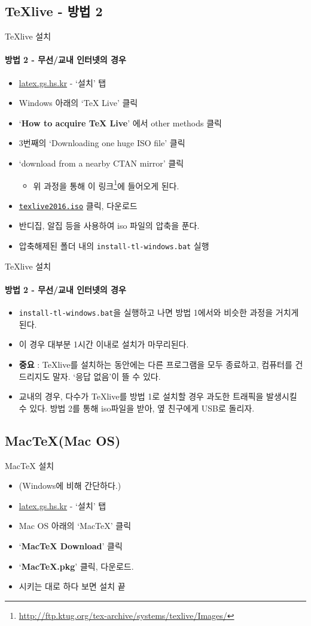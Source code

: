 \documentclass[12pt]{beamer}
\begin{document}
\subsection{TeXlive - 방법 2}
\begin{frame}{TeXlive 설치}
	\framesubtitle{방법 2 - 무선/교내 인터넷의 경우}
	\small
	\begin{itemize}
		\item \url{latex.gs.hs.kr} - `설치' 탭
		\item Windows 아래의 `TeX Live' 클릭
		\item `\textbf{How to acquire TeX Live}' 에서 other methods 클릭
		\item 3번째의 `Downloading one huge ISO file' 클릭
		\item `download from a nearby CTAN mirror' 클릭
		\begin{itemize}
			\item 위 과정을 통해 이 링크\footnote{\url{http://ftp.ktug.org/tex-archive/systems/texlive/Images/}}에 들어오게 된다.
		\end{itemize}
		\item \texttt{\underline{texlive2016.iso}} 클릭, 다운로드
		\item 반디집, 알집 등을 사용하여 iso 파일의 압축을 푼다.
		\item 압축해제된 폴더 내의 \texttt{install-tl-windows.bat} 실행
	\end{itemize}
\end{frame}
\begin{frame}{TeXlive 설치}
	\framesubtitle{방법 2 - 무선/교내 인터넷의 경우}
	\begin{itemize}
		\item \texttt{install-tl-windows.bat}을 실행하고 나면 방법 1에서와 비슷한 과정을 거치게 된다.
		\item 이 경우 대부분 1시간 이내로 설치가 마무리된다.
		\item \textbf{중요} : TeXlive를 설치하는 동안에는 다른 프로그램을 모두 종료하고, 컴퓨터를 건드리지도 말자. `응답 없음'이 뜰 수 있다.
		\item 교내의 경우, 다수가 TeXlive를 방법 1로 설치할 경우 과도한 트래픽을 발생시킬 수 있다. 방법 2를 통해 iso파일을 받아, 옆 친구에게 USB로 돌리자.
	\end{itemize}
\end{frame}
\subsection{MacTeX(Mac OS)}
\begin{frame}{MacTeX 설치}
	\begin{itemize}
		\item (Windows에 비해 간단하다.)
		\item \url{latex.gs.hs.kr} - `설치' 탭
		\item Mac OS 아래의 `MacTeX' 클릭
		\item `\textbf{MacTeX Download}' 클릭
		\item `\textbf{MacTeX.pkg}' 클릭, 다운로드.
		\item 시키는 대로 하다 보면 설치 끝
	\end{itemize}
\end{frame}
\end{document}
